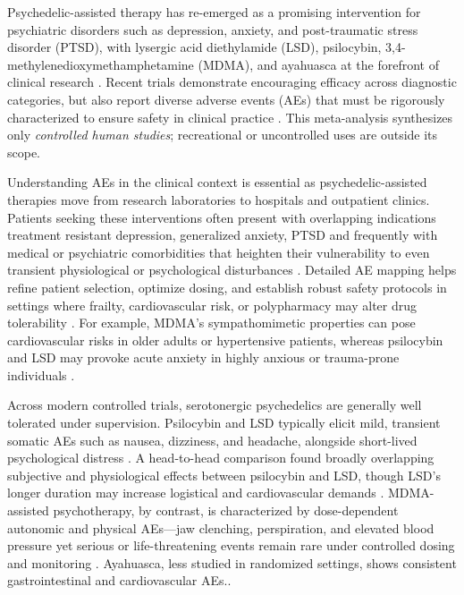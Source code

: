 Psychedelic-assisted therapy has re-emerged as a promising intervention for psychiatric disorders such as depression, anxiety, and post-traumatic stress disorder (PTSD), with lysergic acid diethylamide (LSD), psilocybin, 3,4-methylenedioxymethamphetamine (MDMA), and ayahuasca at the forefront of clinical research \cite{breeksema2022adverse,hinkle2024adverse}. Recent trials demonstrate encouraging efficacy across diagnostic categories, but also report diverse adverse events (AEs) that must be rigorously characterized to ensure safety in clinical practice \cite{colcott2024mdma,hinkle2024adverse}. This meta-analysis synthesizes only \emph{controlled human studies}; recreational or uncontrolled uses are outside its scope.

Understanding AEs in the clinical context is essential as psychedelic-assisted therapies move from research laboratories to hospitals and outpatient clinics. Patients seeking these interventions often present with overlapping indications treatment resistant depression, generalized anxiety, PTSD and frequently with medical or psychiatric comorbidities that heighten their vulnerability to even transient physiological or psychological disturbances \cite{scala2024revival,sarparast2022interactions}. Detailed AE mapping helps refine patient selection, optimize dosing, and establish robust safety protocols in settings where frailty, cardiovascular risk, or polypharmacy may alter drug tolerability \cite{breeksema2022adverse,hinkle2024adverse}. For example, MDMA’s sympathomimetic properties can pose cardiovascular risks in older adults or hypertensive patients, whereas psilocybin and LSD may provoke acute anxiety in highly anxious or trauma-prone individuals \cite{colcott2024mdma,holze2022direct,sarparast2022interactions}.

Across modern controlled trials, serotonergic psychedelics are generally well tolerated under supervision. Psilocybin and LSD typically elicit mild, transient somatic AEs such as nausea, dizziness, and headache, alongside short-lived psychological distress \cite{hinkle2024adverse,scala2024revival,breeksema2022adverse}. A head-to-head comparison found broadly overlapping subjective and physiological effects between psilocybin and LSD, though LSD’s longer duration may increase logistical and cardiovascular demands \cite{holze2022direct}. MDMA-assisted psychotherapy, by contrast, is characterized by dose-dependent autonomic and physical AEs—jaw clenching, perspiration, and elevated blood pressure yet serious or life-threatening events remain rare under controlled dosing and monitoring \cite{colcott2024mdma,sarparast2022interactions}. Ayahuasca, less studied in randomized settings, shows consistent gastrointestinal and cardiovascular AEs.\cite{breeksema2022adverse,feulner2023anxiety}.

